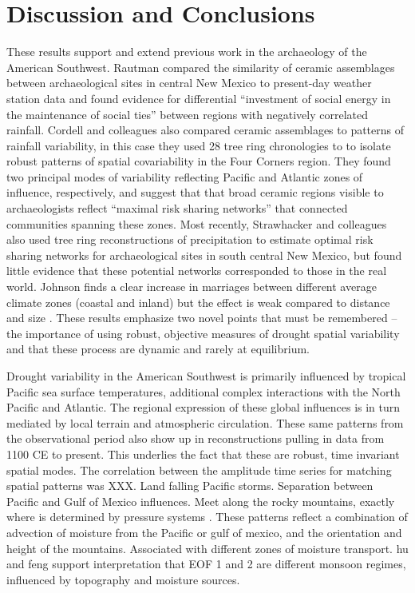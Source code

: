 \documentclass[10pt]{iopart}
\begin{document}
\section*{Discussion and Conclusions}
These results support and extend previous work in the archaeology of the American Southwest. Rautman \parencite{Rautman1993a} compared the similarity of ceramic assemblages between archaeological sites in central New Mexico to present-day weather station data and found evidence for differential ``investment of social energy in the maintenance of social ties'' between regions with negatively correlated rainfall. Cordell and colleagues \parencite{Cordell2007}  also compared ceramic assemblages to patterns of rainfall variability, in this case they used 28 tree ring chronologies to to isolate robust patterns of spatial covariability in the Four Corners region. They found two principal modes of variability reflecting Pacific and Atlantic zones of influence, respectively, and suggest that that broad ceramic regions visible to archaeologists reflect ``maximal risk sharing networks'' that connected communities spanning these zones. Most recently, Strawhacker and colleagues \parencite{Strawhacker2017RiskProvince} also used tree ring reconstructions of precipitation to estimate optimal risk sharing networks for archaeological sites in south central New Mexico, but found little evidence that these potential networks corresponded to those in the real world. Johnson finds a clear increase in marriages between different average climate zones (coastal and inland) but the effect is weak compared to distance and  size \parencite{Johnson1990ChumashAnalysis}. These results emphasize two novel points that must be remembered -- the importance of using robust, objective measures of drought spatial variability and that these process are dynamic and rarely at equilibrium.

Drought variability in the American Southwest is primarily influenced by tropical Pacific sea surface temperatures, additional complex interactions with the North Pacific and Atlantic. The regional expression of these global influences is in turn mediated by local terrain and atmospheric circulation. These same patterns from the observational period also show up in reconstructions pulling in data from 1100 CE to present. This underlies the fact that these are robust, time invariant spatial modes. The correlation between the amplitude time series for matching spatial patterns was XXX. 
Land falling Pacific storms. Separation between Pacific and Gulf of Mexico influences. Meet along the rocky mountains, exactly where is determined by pressure systems \parencite{Liu2010}.
These patterns reflect a combination of advection of moisture from the Pacific or gulf of mexico, and the orientation and height of the mountains.
Associated with different zones of moisture transport.
hu and feng support interpretation that EOF 1 and 2 are different monsoon regimes, influenced by topography and moisture sources.
\end{document}
